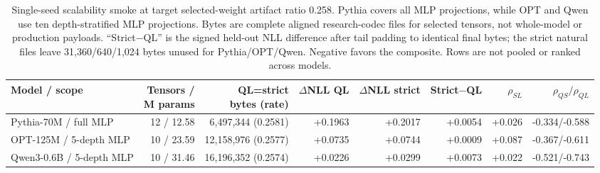 \begin{table}[t]
\centering
\caption{Single-seed scalability smoke at target selected-weight artifact ratio 0.258. Pythia covers all MLP projections, while OPT and Qwen use ten depth-stratified MLP projections. Bytes are complete aligned research-codec files for selected tensors, not whole-model or production payloads. ``Strict$-$QL'' is the signed held-out NLL difference after tail padding to identical final bytes; the strict natural files leave 31,360/640/1,024 bytes unused for Pythia/OPT/Qwen. Negative favors the composite. Rows are not pooled or ranked across models.}
\label{tab:scaling-pilot}
\footnotesize
\setlength{\tabcolsep}{4.5pt}
\begin{tabular*}{\textwidth}{@{\extracolsep{\fill}}lrrrrrrr@{}}
\toprule
Model / scope & \shortstack{Tensors /\\M params} & \shortstack{QL=strict\\bytes (rate)} & $\Delta$NLL QL & $\Delta$NLL strict & Strict$-$QL & $\rho_{SL}$ & $\rho_{QS}/\rho_{QL}$ \\
\midrule
Pythia-70M / full MLP & 12 / 12.58 & 6,497,344 (0.2581) & +0.1963 & +0.2017 & +0.0054 & +0.026 & -0.334/-0.588 \\
OPT-125M / 5-depth MLP & 10 / 23.59 & 12,158,976 (0.2577) & +0.0735 & +0.0744 & +0.0009 & +0.087 & -0.367/-0.611 \\
Qwen3-0.6B / 5-depth MLP & 10 / 31.46 & 16,196,352 (0.2574) & +0.0226 & +0.0299 & +0.0073 & +0.022 & -0.521/-0.743 \\
\bottomrule
\end{tabular*}
\end{table}
